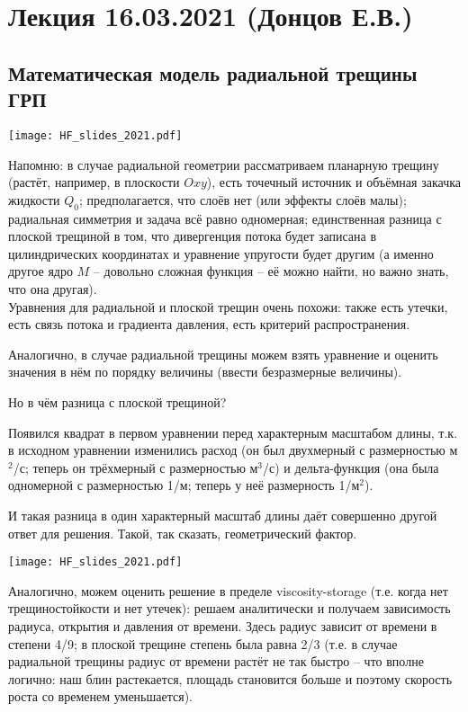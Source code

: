 \documentclass[main.tex]{subfiles}
\begin{document}

\section{Лекция 16.03.2021 (Донцов Е.В.)}

\subsection{Математическая модель радиальной трещины ГРП}

\texttt{[image: HF\_slides\_2021.pdf]}

Напомню: в случае радиальной геометрии рассматриваем планарную трещину (растёт, например, в плоскости $Oxy$), есть точечный источник и объёмная закачка жидкости $Q_0$; предполагается, что слоёв нет (или эффекты слоёв малы);
радиальная симметрия и задача всё равно одномерная; единственная разница с плоской трещиной в том, что дивергенция потока будет записана в цилиндрических координатах и уравнение упругости будет другим (а именно другое ядро $M$ -- довольно сложная функция -- её можно найти, но важно знать, что она другая).
\\

Уравнения для радиальной и плоской трещин очень похожи: также есть утечки, есть связь потока и градиента давления, есть критерий распространения.

Аналогично, в случае радиальной трещины можем взять уравнение и оценить значения в нём по порядку величины (ввести безразмерные величины).

Но в чём разница с плоской трещиной?

Появился квадрат в первом уравнении перед характерным масштабом длины, т.к. в исходном уравнении изменились расход (он был двухмерный с размерностью м$^2$/с; теперь он трёхмерный с размерностью м$^3$/с) и дельта-функция (она была одномерной с размерностью 1/м; теперь у неё размерность 1/м$^2$).

И такая разница в один характерный масштаб длины даёт совершенно другой ответ для решения.
Такой, так сказать, геометрический фактор.

\texttt{[image: HF\_slides\_2021.pdf]}

Аналогично, можем оценить решение в пределе viscosity-storage (т.е. когда нет трещиностойкости и нет утечек): решаем аналитически и получаем зависимость радиуса, открытия и давления от времени.
Здесь радиус зависит от времени в степени 4/9; в плоской трещине степень была равна 2/3 (т.е. в случае радиальной трещины радиус от времени растёт не так быстро -- что вполне логично: наш блин растекается, площадь становится больше и поэтому скорость роста со временем уменьшается).
\end{document}
